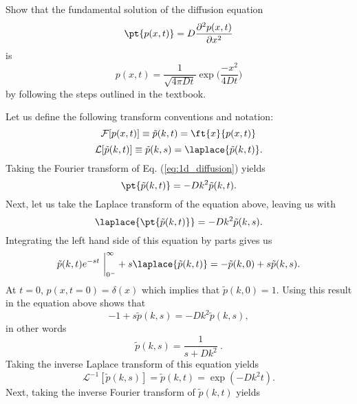 Show that the fundamental solution of the diffusion equation
\begin{equation}
\pt{p(x,t)} = D \frac{\partial^2 p(x,t)}{\partial x^2} \label{eq:1d_diffusion}
\end{equation}
is
\begin{equation}
p(x,t) = \frac{1}{\sqrt{4 \pi D t}} \exp\bigg( \frac{- x^2}{4 D t}\bigg)
\end{equation}
by following the steps outlined in the textbook.

Let us define the following transform conventions and notation:
\begin{equation}
\mathcal{F} [p(x ,t)] \equiv   \tilde{p}(k, t) = \ft{x}{p(x,t)}
\end{equation}
\begin{equation}
\mathcal{L} [ \tilde{p}(k, t)] \equiv  \tilde{p}(k, s) = \laplace{\tilde{p}(k, t)}.
\end{equation}
Taking the Fourier transform of Eq. (\ref{eq:1d_diffusion}) yields
\begin{equation}
\pt{\tilde{p}(k, t)} = -D k^2 \tilde{p}(k, t).
\end{equation}
Next, let us take the Laplace transform of the equation above, leaving us with
\begin{equation}
\laplace{\pt{\tilde{p}(k, t)}} = -D k^2 \tilde{p}(k, s).
\end{equation}
Integrating the left hand side of this equation by parts gives us
\begin{equation}
\tilde{p}(k, t) e^{-s t}~\bigg|_{0^{-}}^{\infty} + s \laplace{\tilde{p}(k, t)} = -\tilde{p}(k, 0) + s \tilde{p}(k, s).
\end{equation}
At $t=0$, $p(x,t=0) = \delta(x)$ which implies that $\tilde{p}(k, 0) = 1$. Using this result in the equation above shows that
\begin{equation}
-1 + s \tilde{p}(k, s) = -D k^2 \tilde{p}(k, s),
\end{equation}
in other words
\begin{equation}
\boxed{\tilde{p}(k, s)  = \frac{1}{s + D k^2}}~.
\end{equation}
Taking the inverse Laplace transform of this equation yields
\begin{equation}
\mathcal{L}^{-1} [\tilde{p}(k, s)] = \tilde{p}(k, t) = \exp(-D k^2 t).
\end{equation}
Next, taking the inverse Fourier transform of $\tilde{p}(k, t)$ yields
